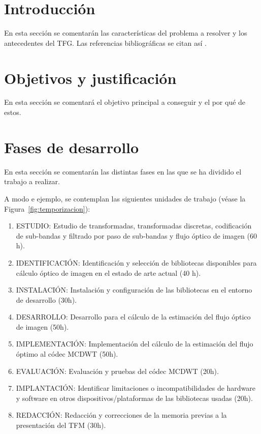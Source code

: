 \documentclass[titlepage, 12pt, a4paper, oneside]{article}
\begin{document}
\normalsize

\section{Introducción}
En esta sección se comentarán las características del problema a resolver y los antecedentes del TFG. Las referencias bibliográficas se citan así \cite{einstein1922kosmologische}.

\section{Objetivos y justificación}
En esta sección se comentará el objetivo principal a conseguir y el por qué de estos.

\section{Fases de desarrollo}
En esta sección se comentarán las distintas fases en las que se ha dividido el trabajo a realizar.

A modo e ejemplo, se contemplan las siguientes unidades de trabajo (véase la Figura~\ref{fig:temporizacion}):
\begin{enumerate}
  \item {ESTUDIO:} Estudio de transformadas, transformadas discretas,
    codificación de sub-bandas y filtrado por paso de sub-bandas y
    flujo óptico de imagen (60 h).
  \item {IDENTIFICACIÓN}: Identificación y selección de bibliotecas disponibles para
    cálculo óptico de imagen en el estado de arte actual (40 h).
  \item {INSTALACIÓN}: Instalación y configuración de las bibliotecas en el entorno
    de desarrollo (30h).
  \item {DESARROLLO}: Desarrollo para el cálculo de la estimación del flujo óptico
    de imagen (50h).
  \item {IMPLEMENTACIÓN}: Implementación del cálculo de la estimación del flujo óptimo
    al códec MCDWT (50h).
  \item {EVALUACIÓN}: Evaluación y pruebas del códec MCDWT (20h).
  \item {IMPLANTACIÓN}: Identificar limitaciones o incompatibilidades de hardware y
    software en otros dispositivos/plataformas de las bibliotecas
    usadas (20h).
  \item {REDACCIÓN}: Redacción y correcciones de la memoria previas a la
    presentación del TFM (30h).
\end{enumerate}
\end{document}
